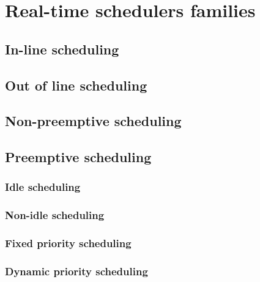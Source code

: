 
\chapter{Real-time schedulers families}

\section{In-line scheduling}

\section{Out of line scheduling}

\section{Non-preemptive scheduling}

\section{Preemptive scheduling}

\subsection{Idle scheduling}

\subsection{Non-idle scheduling}

\subsection{Fixed priority scheduling}

\subsection{Dynamic priority scheduling}

